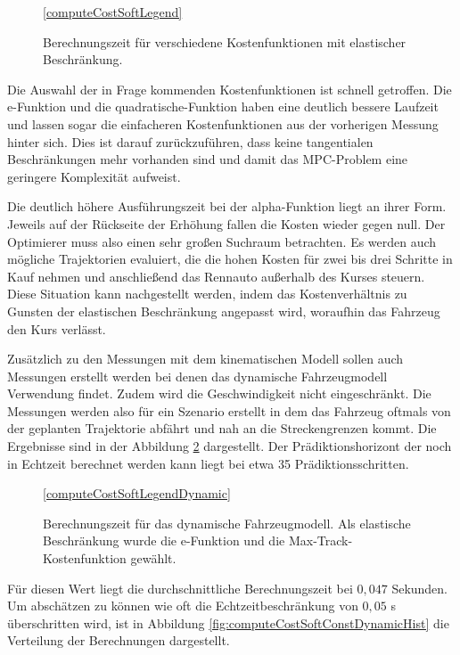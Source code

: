\documentclass{like}
\begin{document}
\begin{figure}[ht!]
	\centering
	 
	\ref{computeCostSoftLegend}
	\caption{Berechnungszeit für verschiedene Kostenfunktionen mit elastischer Be\-schrän\-kung.}
	\label{fig:computeCostSoftConst}
\end{figure}

Die Auswahl der in Frage kommenden Kostenfunktionen ist schnell getroffen. Die e-Funktion und die quadratische-Funktion haben eine deutlich bessere Laufzeit und lassen sogar die einfacheren Kostenfunktionen aus der vorherigen Messung hinter sich. Dies ist darauf zurückzuführen, dass keine tangentialen Beschränkungen mehr vorhanden sind und damit das \ac{MPC}-Problem eine geringere Komplexität aufweist.

Die deutlich höhere Ausführungszeit bei der alpha-Funktion liegt an ihrer Form. Jeweils auf der Rückseite der Erhöhung fallen die Kosten wieder gegen null. Der Optimierer muss also einen sehr großen Suchraum betrachten. Es werden auch mögliche Trajektorien evaluiert, die die hohen Kosten für zwei bis drei Schritte in Kauf nehmen und anschließend das Rennauto außerhalb des Kurses steuern. Diese Situation kann nachgestellt werden, indem das Kostenverhältnis zu Gunsten der elastischen Beschränkung angepasst wird, woraufhin das Fahrzeug den Kurs verlässt.  

Zusätzlich zu den Messungen mit dem kinematischen Modell sollen auch Messungen erstellt werden bei denen das dynamische Fahrzeugmodell Verwendung findet. Zudem wird die Geschwindigkeit nicht eingeschränkt. Die Messungen werden also für ein Szenario erstellt in dem das Fahrzeug oftmals von der geplanten Trajektorie abfährt und nah an die Streckengrenzen kommt. Die Ergebnisse sind in der Abbildung \ref{fig:computeCostSoftConstDynamic} dargestellt. Der Prädiktionshorizont der noch in Echtzeit berechnet werden kann liegt bei etwa 35 Prädiktionsschritten.

\begin{figure}[ht!]
	\centering
	 
	\ref{computeCostSoftLegendDynamic}
	\caption{Berechnungszeit für das dynamische Fahrzeugmodell. Als elastische Be\-schrän\-kung wurde die e-Funktion und die Max-Track-Kostenfunktion gewählt.}
	\label{fig:computeCostSoftConstDynamic}
\end{figure}

Für diesen Wert liegt die durchschnittliche Berechnungszeit bei $0,047$ Sekunden. Um abschätzen zu können wie oft die Echtzeitbeschränkung von $0,05$ s überschritten wird, ist in Abbildung \ref{fig:computeCostSoftConstDynamicHist} die Verteilung der Berechnungen dargestellt. 
\end{document}
